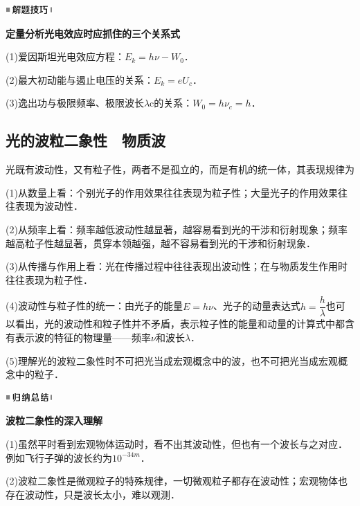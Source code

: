 \begin{center}
  \includegraphics[width=0.70764in,height=0.12292in]{media/image37.png}
\end{center}
\begin{center}
  \textbf{定量分析光电效应时应抓住的三个关系式}
\end{center}

(1)爱因斯坦光电效应方程：$E_k=h\nu-W_0$．

(2)最大初动能与遏止电压的关系：$E_k=eU_c$．

(3)逸出功与极限频率、极限波长$\lambda$c的关系：$W_0=h\nu_c=h$．


\newpage
\subsection{光的波粒二象性　物质波}

光既有波动性，又有粒子性，两者不是孤立的，而是有机的统一体，其表现规律为

(1)从数量上看：个别光子的作用效果往往表现为粒子性；大量光子的作用效果往往表现为波动性．

(2)从频率上看：频率越低波动性越显著，越容易看到光的干涉和衍射现象；频率越高粒子性越显著，贯穿本领越强，越不容易看到光的干涉和衍射现象．

(3)从传播与作用上看：光在传播过程中往往表现出波动性；在与物质发生作用时往往表现为粒子性．

(4)波动性与粒子性的统一：由光子的能量$E=h\nu$、光子的动量表达式$h=\dfrac{h}{\lambda}$也可以看出，光的波动性和粒子性并不矛盾，表示粒子性的能量和动量的计算式中都含有表示波的特征的物理量------频率$\nu$和波长$\lambda$．

(5)理解光的波粒二象性时不可把光当成宏观概念中的波，也不可把光当成宏观概念中的粒子．

\begin{center}\includegraphics[width=0.70764in,height=0.12292in]{media/image13.png}\end{center}
\begin{center}
  \textbf{波粒二象性的深入理解}
\end{center}

(1)虽然平时看到宏观物体运动时，看不出其波动性，但也有一个波长与之对应．例如飞行子弹的波长约为$10^{-34m}$．

(2)波粒二象性是微观粒子的特殊规律，一切微观粒子都存在波动性；宏观物体也存在波动性，只是波长太小，难以观测．

